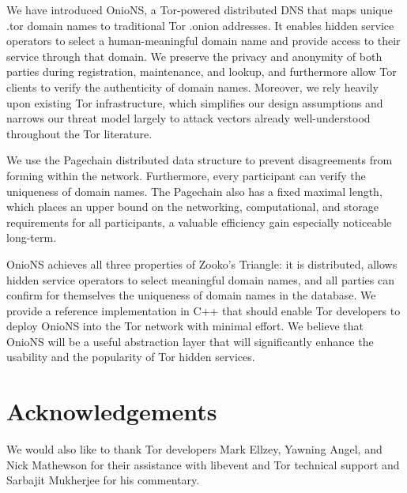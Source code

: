 \documentclass{sig-alternate}
\begin{document}
We have introduced OnioNS, a Tor-powered distributed DNS that maps unique .tor domain names to traditional Tor .onion addresses. It enables hidden service operators to select a human-meaningful domain name and provide access to their service through that domain. We preserve the privacy and anonymity of both parties during registration, maintenance, and lookup, and furthermore allow Tor clients to verify the authenticity of domain names. Moreover, we rely heavily upon existing Tor infrastructure, which simplifies our design assumptions and narrows our threat model largely to attack vectors already well-understood throughout the Tor literature.

We use the Pagechain distributed data structure to prevent disagreements from forming within the network. Furthermore, every participant can verify the uniqueness of domain names. The Pagechain also has a fixed maximal length, which places an upper bound on the networking, computational, and storage requirements for all participants, a valuable efficiency gain especially noticeable long-term.

OnioNS achieves all three properties of Zooko's Triangle: it is distributed, allows hidden service operators to select meaningful domain names, and all parties can confirm for themselves the uniqueness of domain names in the database. We provide a reference implementation in C++ that should enable Tor developers to deploy OnioNS into the Tor network with minimal effort. We believe that OnioNS will be a useful abstraction layer that will significantly enhance the usability and the popularity of Tor hidden services. 

\section{Acknowledgements}

We would also like to thank Tor developers Mark Ellzey, Yawning Angel, and Nick Mathewson for their assistance with libevent and Tor technical support and Sarbajit Mukherjee for his commentary.



\end{document}
